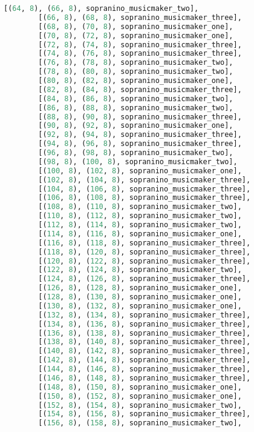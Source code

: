 \begin{lstlisting}[language=Python, caption=Invocation Source Code]
        [(64, 8), (66, 8), sopranino_musicmaker_two],
        [(66, 8), (68, 8), sopranino_musicmaker_three],
        [(68, 8), (70, 8), sopranino_musicmaker_one],
        [(70, 8), (72, 8), sopranino_musicmaker_one],
        [(72, 8), (74, 8), sopranino_musicmaker_three],
        [(74, 8), (76, 8), sopranino_musicmaker_three],
        [(76, 8), (78, 8), sopranino_musicmaker_two],
        [(78, 8), (80, 8), sopranino_musicmaker_two],
        [(80, 8), (82, 8), sopranino_musicmaker_one],
        [(82, 8), (84, 8), sopranino_musicmaker_three],
        [(84, 8), (86, 8), sopranino_musicmaker_two],
        [(86, 8), (88, 8), sopranino_musicmaker_two],
        [(88, 8), (90, 8), sopranino_musicmaker_three],
        [(90, 8), (92, 8), sopranino_musicmaker_one],
        [(92, 8), (94, 8), sopranino_musicmaker_three],
        [(94, 8), (96, 8), sopranino_musicmaker_three],
        [(96, 8), (98, 8), sopranino_musicmaker_two],
        [(98, 8), (100, 8), sopranino_musicmaker_two],
        [(100, 8), (102, 8), sopranino_musicmaker_one],
        [(102, 8), (104, 8), sopranino_musicmaker_three],
        [(104, 8), (106, 8), sopranino_musicmaker_three],
        [(106, 8), (108, 8), sopranino_musicmaker_three],
        [(108, 8), (110, 8), sopranino_musicmaker_two],
        [(110, 8), (112, 8), sopranino_musicmaker_two],
        [(112, 8), (114, 8), sopranino_musicmaker_two],
        [(114, 8), (116, 8), sopranino_musicmaker_one],
        [(116, 8), (118, 8), sopranino_musicmaker_three],
        [(118, 8), (120, 8), sopranino_musicmaker_three],
        [(120, 8), (122, 8), sopranino_musicmaker_three],
        [(122, 8), (124, 8), sopranino_musicmaker_two],
        [(124, 8), (126, 8), sopranino_musicmaker_three],
        [(126, 8), (128, 8), sopranino_musicmaker_one],
        [(128, 8), (130, 8), sopranino_musicmaker_one],
        [(130, 8), (132, 8), sopranino_musicmaker_one],
        [(132, 8), (134, 8), sopranino_musicmaker_three],
        [(134, 8), (136, 8), sopranino_musicmaker_three],
        [(136, 8), (138, 8), sopranino_musicmaker_three],
        [(138, 8), (140, 8), sopranino_musicmaker_three],
        [(140, 8), (142, 8), sopranino_musicmaker_three],
        [(142, 8), (144, 8), sopranino_musicmaker_three],
        [(144, 8), (146, 8), sopranino_musicmaker_three],
        [(146, 8), (148, 8), sopranino_musicmaker_three],
        [(148, 8), (150, 8), sopranino_musicmaker_one],
        [(150, 8), (152, 8), sopranino_musicmaker_one],
        [(152, 8), (154, 8), sopranino_musicmaker_two],
        [(154, 8), (156, 8), sopranino_musicmaker_three],
        [(156, 8), (158, 8), sopranino_musicmaker_two],

\end{lstlisting}

